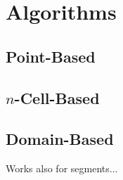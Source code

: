 \chapter{Algorithms} \label{chap:algorithms}

\section{Point-Based}

\section{$n$-Cell-Based}

\section{Domain-Based}
 
Works also for segments...

